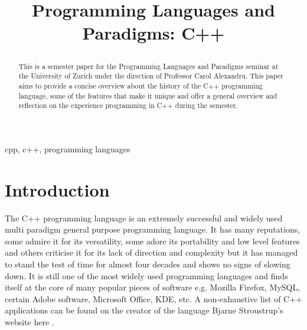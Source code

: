 \documentclass[conference, a4paper]{IEEEtran}
\begin{document}
\title{Programming Languages and Paradigms: C++

}

\author{
}

\maketitle

\begin{abstract}
This is a semester paper for the Programming Languages and Paradigms seminar at the University of Zurich under the direction of Professor Carol Alexandru. This paper aims to provide a concise overview about the history of the C++ programming language, some of the features that make it unique and offer a general overview and reflection on the experience programming in C++ during the semester.\\
\end{abstract}

\begin{IEEEkeywords}
cpp, c++, programming languages
\end{IEEEkeywords}

\section{Introduction}
The C++ programming language is an extremely successful and widely used multi paradigm general purpose programming language. It has many reputations, some admire it for its versatility, some adore its portability and low level features and others criticise it for its lack of direction and complexity but it has managed to stand the test of time for almost four decades and shows no signs of slowing down. It is still one of the most widely used programming languages and finds itself at the core of many popular pieces of software e.g. Mozilla Firefox, MySQL, certain Adobe software, Microsoft Office, KDE, etc. A non-exhaustive list of C++ applications can be found on the creator of the language Bjarne Stroustrup's website here \cite{cppapplications} .
\end{document}
